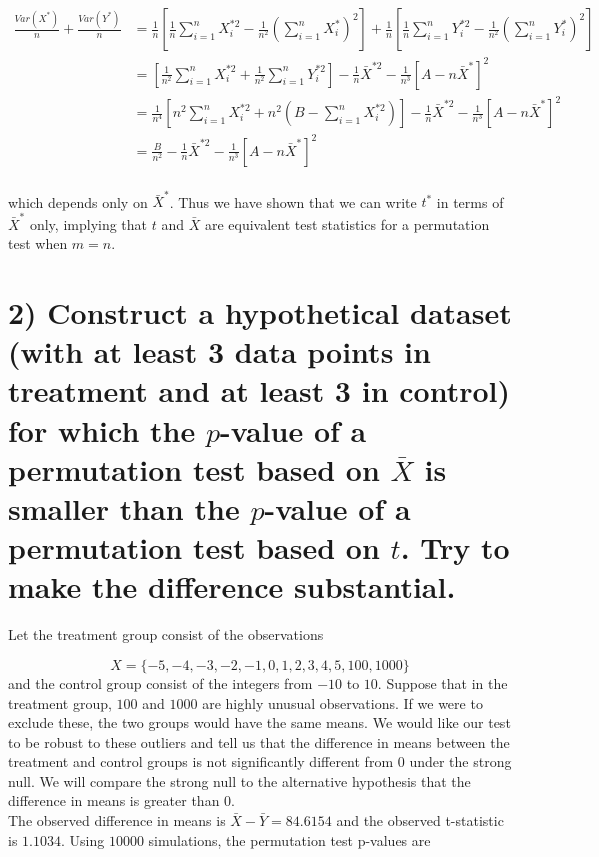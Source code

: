 \documentclass[11pt]{article}
\begin{document}
\begin{align*}
\frac{Var(X^*)}{n} + \frac{Var(Y^*)}{n} &= \frac{1}{n} \left[ \frac1n \sum_{i=1}^n X_i^{*2} - \frac{1}{n^2} \left( \sum_{i=1}^n X_i^*\right)^2 \right] + \frac{1}{n} \left[ \frac1n \sum_{i=1}^n Y_i^{*2} - \frac{1}{n^2} \left( \sum_{i=1}^n Y_i^*\right)^2 \right]\\
& = \left[ \frac{1}{n^2} \sum_{i=1}^n X_i^{*2} + \frac{1}{n^2} \sum_{i=1}^n Y_i^{*2} \right] - \frac1n\bar{X}^{*2} - \frac{1}{n^3} \left[A - n \bar{X}^* \right]^2\\
& = \frac{1}{n^4}\left[ n^2 \sum_{i=1}^n X_i^{*2} + n^2\left(B - \sum_{i=1}^n X_i^{*2}\right) \right] - \frac1n\bar{X}^{*2} - \frac{1}{n^3} \left[A - n \bar{X}^* \right]^2\\
& = \frac{B}{n^2} - \frac1n\bar{X}^{*2} - \frac{1}{n^3} \left[A - n \bar{X}^* \right]^2\\
\end{align*}

\noindent which depends only on $\bar{X}^{*}$. Thus we have shown that we can write $t^*$ in terms of $\bar{X}^*$ only, implying that $t$ and $\bar{X}$ are equivalent test statistics for a permutation test when $m  = n$.


\section*{2) Construct a hypothetical dataset (with at least 3 data points in treatment and at least 3 in control) for which the $p$-value of a permutation test based on $\bar{X}$ is smaller than the $p$-value of a permutation test based on $t$. Try to make the difference substantial.}
Let the treatment group consist of the observations

$$ X = \{ -5, -4, -3, -2, -1, 0, 1, 2, 3, 4, 5, 100, 1000\}$$
and the control group consist of the integers from $-10$ to $10$.  Suppose that in the treatment group, $100$ and $1000$ are highly unusual observations.  If we were to exclude these, the two groups would have the same means.  We would like our test to be robust to these outliers and tell us that the difference in means between the treatment and control groups is not significantly different from $0$ under the strong null.  We will compare the strong null to the alternative hypothesis that the difference in means is greater than $0$.  \\

The observed difference in means is $\bar{X} - \bar{Y} = 84.6154$ and the observed t-statistic is $1.1034$.  Using $10000$ simulations, the permutation test p-values are
\end{document}
